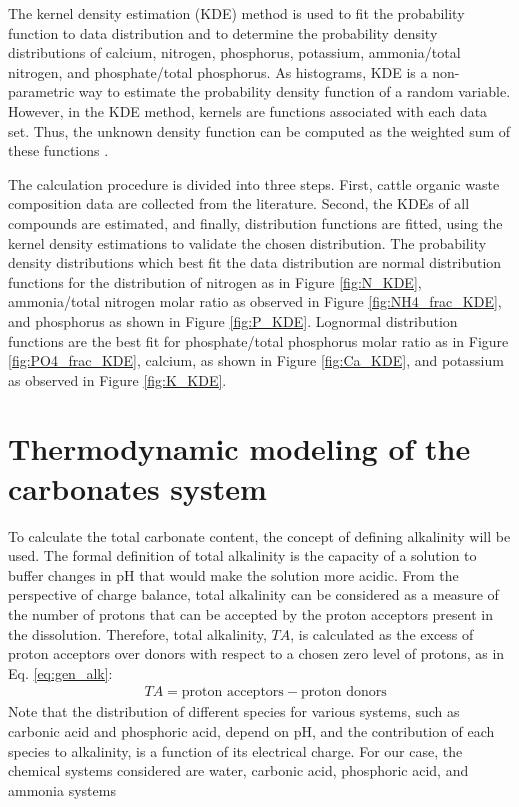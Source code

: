 \begin{refsection}[referencesCh3]
The kernel density estimation (KDE) method is used to fit the probability function to data distribution and to determine the probability density distributions of calcium, nitrogen, phosphorus, potassium, ammonia/total nitrogen, and phosphate/total phosphorus. As histograms, KDE is a non-parametric way to estimate the probability density function of a random variable. However, in the KDE method, kernels are functions associated with each data set. Thus, the unknown density function can be computed as the weighted sum of these functions \citep{Duong}. 

The calculation procedure is divided into three steps. First, cattle organic waste composition data are collected from the literature. Second, the KDEs of all compounds are estimated, and finally, distribution functions are fitted, using the kernel density estimations to validate the chosen distribution. The probability density distributions which best fit the data distribution are normal distribution functions for the distribution of nitrogen as in Figure \ref{fig:N_KDE}, ammonia/total nitrogen molar ratio as observed in Figure \ref{fig:NH4_frac_KDE}, and phosphorus as shown in Figure \ref{fig:P_KDE}. Lognormal distribution functions are the best fit for phosphate/total phosphorus molar ratio as in Figure \ref{fig:PO4_frac_KDE}, calcium, as shown in Figure \ref{fig:Ca_KDE}, and potassium as observed in Figure \ref{fig:K_KDE}.

\newpage

\section{Thermodynamic modeling of the carbonates system} \label{Carbonates}
To calculate the total carbonate content, the concept of defining alkalinity will be used. The formal definition of total alkalinity is the capacity of a solution to buffer changes in pH that would make the solution more acidic.
From the perspective of charge balance, total alkalinity can be considered as a measure of the number of protons that can be accepted by the proton acceptors present in the dissolution. Therefore, total alkalinity, $TA$, is calculated as the excess of proton acceptors over donors with respect to a chosen zero level of protons, as in Eq. \ref{eq:gen_alk}:
\begin{align} 
& TA = \text{proton acceptors} - \text{proton donors} \label{eq:gen_alk}
\end{align}
Note that the distribution of different species for various systems, such as carbonic acid and phosphoric acid, depend on pH, and the contribution of each species to alkalinity, is a function of its electrical charge. For our case, the chemical systems considered are water, carbonic acid, phosphoric acid, and ammonia systems


\end{refsection}
